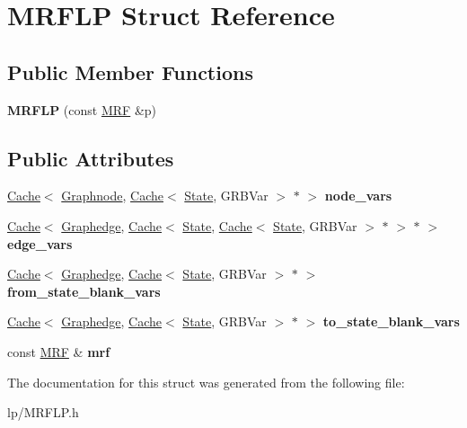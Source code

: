 \hypertarget{structMRFLP}{
\section{MRFLP Struct Reference}
\label{structMRFLP}
}
\subsection*{Public Member Functions}
\begin{DoxyCompactItemize}
\item 
\hypertarget{structMRFLP_a868a64efdbf8d42682c7953361af4c31}{
{\bfseries MRFLP} (const \hyperlink{classMRF}{MRF} \&p)}
\label{structMRFLP_a868a64efdbf8d42682c7953361af4c31}

\end{DoxyCompactItemize}
\subsection*{Public Attributes}
\begin{DoxyCompactItemize}
\item 
\hypertarget{structMRFLP_a1ddb2cc0eb980dc0d9d94bf731e3f4ae}{
\hyperlink{classCache}{Cache}$<$ \hyperlink{classScarab_1_1Graph_1_1Graphnode}{Graphnode}, \hyperlink{classCache}{Cache}$<$ \hyperlink{structState}{State}, GRBVar $>$ $\ast$ $>$ {\bfseries node\_\-vars}}
\label{structMRFLP_a1ddb2cc0eb980dc0d9d94bf731e3f4ae}

\item 
\hypertarget{structMRFLP_a7f977d31ba7f70b5913279466a46e2b2}{
\hyperlink{classCache}{Cache}$<$ \hyperlink{classScarab_1_1Graph_1_1Graphedge}{Graphedge}, \hyperlink{classCache}{Cache}$<$ \hyperlink{structState}{State}, \hyperlink{classCache}{Cache}$<$ \hyperlink{structState}{State}, GRBVar $>$ $\ast$ $>$ $\ast$ $>$ {\bfseries edge\_\-vars}}
\label{structMRFLP_a7f977d31ba7f70b5913279466a46e2b2}

\item 
\hypertarget{structMRFLP_a46a1042ee20d632ca11afee0a1965fb9}{
\hyperlink{classCache}{Cache}$<$ \hyperlink{classScarab_1_1Graph_1_1Graphedge}{Graphedge}, \hyperlink{classCache}{Cache}$<$ \hyperlink{structState}{State}, GRBVar $>$ $\ast$ $>$ {\bfseries from\_\-state\_\-blank\_\-vars}}
\label{structMRFLP_a46a1042ee20d632ca11afee0a1965fb9}

\item 
\hypertarget{structMRFLP_ae1b4c653d4a3b3c6759a160f8f1c4fc6}{
\hyperlink{classCache}{Cache}$<$ \hyperlink{classScarab_1_1Graph_1_1Graphedge}{Graphedge}, \hyperlink{classCache}{Cache}$<$ \hyperlink{structState}{State}, GRBVar $>$ $\ast$ $>$ {\bfseries to\_\-state\_\-blank\_\-vars}}
\label{structMRFLP_ae1b4c653d4a3b3c6759a160f8f1c4fc6}

\item 
\hypertarget{structMRFLP_a546b7ee8de350e2a882e9ae9beb6af6f}{
const \hyperlink{classMRF}{MRF} \& {\bfseries mrf}}
\label{structMRFLP_a546b7ee8de350e2a882e9ae9beb6af6f}

\end{DoxyCompactItemize}


The documentation for this struct was generated from the following file:\begin{DoxyCompactItemize}
\item 
lp/MRFLP.h\end{DoxyCompactItemize}
